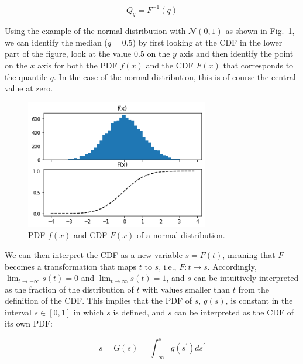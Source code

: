 \documentclass[BCOR=1mm, DIV=calc,10pt,
twoside=true,
twocolumn,
headings=normal]{scrartcl}
\newcommand{\fig}{Fig.~}
\begin{document}
\begin{equation}
Q_q = F^{-1}(q)
\end{equation}

Using the example of the normal distribution with $\mathcal{N}(0,1)$ as shown in \fig \ref{fig:PdfCdf}, we can identify the median ($q = 0.5$) by first looking at the CDF in the lower part of the figure, look at the value $0.5$ on the $y$ axis and then identify the point on the $x$ axis for both the PDF $f(x)$ and the CDF $F(x)$ that corresponds to the quantile $q$. In the case of the normal distribution, this is of course the central value at zero.

\begin{figure}
\begin{center}
\includegraphics[width=8cm]{figs/PdfCdf}
\caption{\label{fig:PdfCdf} PDF $f(x)$ and CDF $F(x)$ of a normal distribution.}
\end{center}
\end{figure}

We can then interpret the CDF as a new variable $s = F(t)$, meaning that $F$ becomes a transformation that maps $t$ to $s$, i.e., $F:t \to s$. Accordingly,  $\lim_{t \to -\infty}s(t) = 0$ and $\lim_{t \to \infty}s(t) = 1$, and $s$ can be intuitively interpreted as the fraction of the distribution of $t$ with values smaller than $t$ from the definition of the CDF. This implies that the PDF of $s$, $g(s)$, is constant in the interval $s \in [0,1]$ in which $s$ is defined, and $s$ can be interpreted as the CDF of its own PDF:

\begin{equation}
s = G(s) = \int_{-\infty}^{s} g(s^\prime) ds^\prime
\end{equation}
\end{document}
